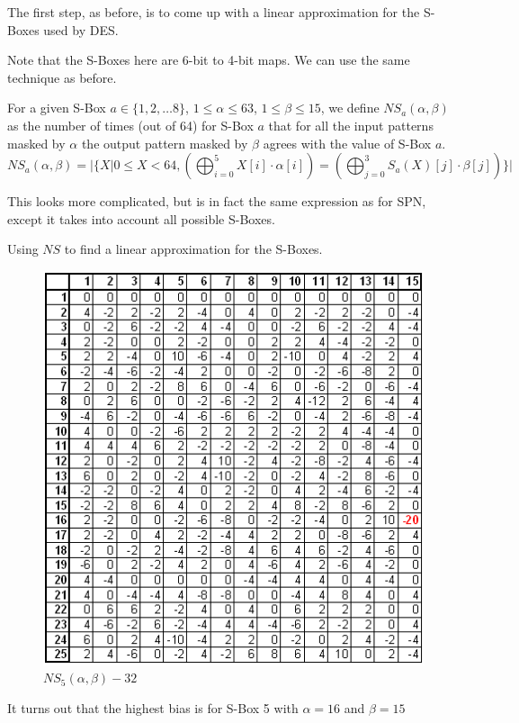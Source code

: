 \documentclass[9pt]{beamer}
\begin{document}
\begin{frame}
The first step, as before, is to come up with a linear approximation for the S-Boxes used by DES.

\vspace{5mm}
\pause Note that the S-Boxes here are 6-bit to 4-bit maps. We can use the same technique as before. 

\vspace{5mm}
\pause For a given S-Box $a \in \{1, 2, \dots 8\}$, $1 \leq \alpha \leq 63$, $1 \leq \beta \leq 15$, we define $NS_{a}(\alpha, \beta)$ as the number of times (out of 64) for S-Box $a$ that for all the input patterns masked by $\alpha$ the output pattern masked by $\beta$ agrees with the value of S-Box $a$.
\[ NS_{a}(\alpha, \beta) = | \{ X | 0 \leq X < 64, ( \bigoplus_{i=0}^5 X[i]\cdot\alpha[i]) = (\bigoplus_{j=0}^3 S_a(X)[j] \cdot \beta[j])\} | \]

\vspace{3mm}
\pause This looks more complicated, but is in fact the same expression as for SPN, except it takes into account all possible S-Boxes.
\end{frame}

\begin{frame}
Using $NS$ to find a linear approximation for the S-Boxes.
\vspace{2mm}
\begin{figure}
\includegraphics[totalheight=0.7\textheight]{NS_S5.PNG}
\caption{$NS_5(\alpha, \beta) - 32$}
\end{figure}
It turns out that the highest bias is for S-Box 5 with $\alpha = 16$ and $\beta = 15$
\end{frame}
\end{document}
